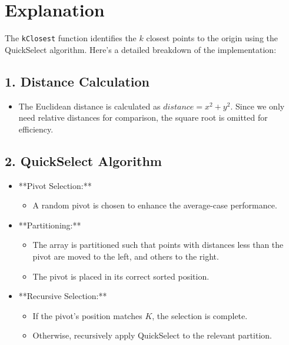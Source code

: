 \section*{Explanation}

The \texttt{kClosest} function identifies the \(k\) closest points to the origin using the QuickSelect algorithm. Here's a detailed breakdown of the implementation:

\subsection*{1. Distance Calculation}

\begin{itemize}
    \item The Euclidean distance is calculated as \(distance = x^2 + y^2\). Since we only need relative distances for comparison, the square root is omitted for efficiency.
\end{itemize}

\subsection*{2. QuickSelect Algorithm}

\begin{itemize}
    \item **Pivot Selection:**
    \begin{itemize}
        \item A random pivot is chosen to enhance the average-case performance.
    \end{itemize}
    
    \item **Partitioning:**
    \begin{itemize}
        \item The array is partitioned such that points with distances less than the pivot are moved to the left, and others to the right.
        \item The pivot is placed in its correct sorted position.
    \end{itemize}
    
    \item **Recursive Selection:**
    \begin{itemize}
        \item If the pivot's position matches \(K\), the selection is complete.
        \item Otherwise, recursively apply QuickSelect to the relevant partition.
    \end{itemize}
\end{itemize}

